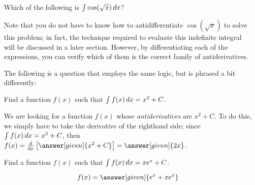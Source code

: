 \documentclass[nooutcomes]{ximera}
\begin{document}
\begin{question}
  Which of the following is $\int \cos(\sqrt{x}) \mathop{}\!d x$?  
  \begin{selectAll}
  \end{selectAll}
 
 \begin{feedback}
 Note that you do not have to know how to antidifferentiate $\cos(\sqrt{x})$ to solve this problem; in fact, the technique required to evaluate this indefinite integral will be discussed in a later section.  However, by differentiating each of the expressions, you can verify which of them is the correct family of antiderivatives.
 \end{feedback}  
\end{question}

The following is a question that employs the same logic, but is phrased a bit differently:

\begin{example}
  Find a function $f(x)$ such that $\int f(x) \mathop{}\!d x = x^2 +C$.
  
  \begin{explanation}
    We are looking for a function $f(x)$ whose \emph{antiderivatives} are $x^2+C$.  To do this, we simply have to take the derivative of the righthand side; since $\int f(x) \mathop{}\!d x =x^2+C$, then $f(x) = \ddx \left[\answer[given]{x^2+C}\right] =\answer[given]{2x}$.
    
    \end{explanation}
\end{example}

\begin{question} 
  Find a function $f(x)$ such that $\int f(x) \mathop{}\!d x = xe^x +C$.

  \begin{prompt} 
    \[
    f(x) = \answer[given]{e^x + xe^x}
    \]
  \end{prompt}
  
\end{question}



\end{document}
